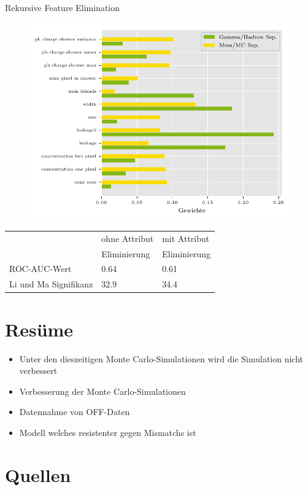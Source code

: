 \documentclass[aspectratio=1610, professionalfonts, 9pt]{beamer}
\begin{document}
\begin{frame}{Rekursive Feature Elimination}
  \begin{figure}
	\centering
	\includegraphics[height=0.9\textheight]{./Plots/feature_elemination.pdf}
  \end{figure}
\end{frame}

\begin{frame}
  \begin{table}
	\centering
	\begin{tabular}{l s s}
	  \toprule
	  & ohne Attribut & mit Attribut \\
	  & Eliminierung  & Eliminierung \\
	  \cmidrule(r){2-3}
	  ROC-AUC-Wert            & \num{0.64} & \num{0.61} \\
	  Li und Ma Signifikanz   & \SI{32.9}{\sigma} & \SI{34.4}{\sigma} \\
	  \bottomrule
	\end{tabular}
  \end{table}
\end{frame}

\section{Resüme}
\begin{frame}
  \begin{itemize}
	\item<1-> Unter den dieszeitigen Monte Carlo-Simulationen wird die Simulation nicht verbessert 
	\item<2-> Verbesserung der Monte Carlo-Simulationen 
	\item<3-> Datennahme von OFF-Daten
	\item<4-> Modell welches resistenter gegen Mismatchs ist
  \end{itemize}
\end{frame}

\section{Quellen}
\begin{frame}
  \printbibliography
\end{frame}
\end{document}
